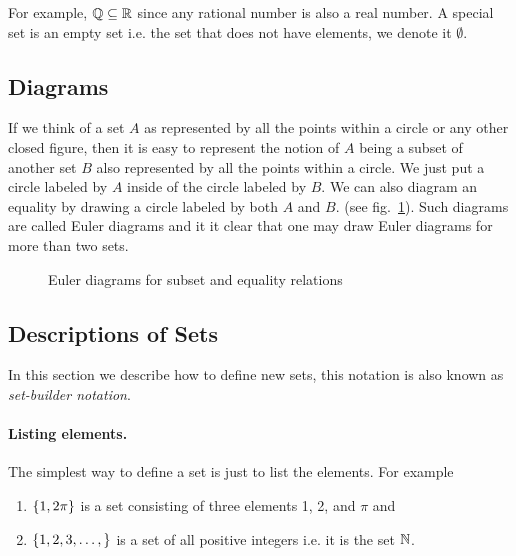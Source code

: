 For example, $\mathbb{Q} \subseteq \mathbb{R}$ since any rational number is
also a real number.
A special set is an empty set i.e. the set that does not have elements, we
denote it $\emptyset$.



\subsection{Diagrams}
If we think of a set $A$ as represented by all the points within a circle or
any other closed figure, then it is easy to represent the notion of $A$ being a
subset of another set $B$ also represented by all the points within a circle.
We just put a circle labeled by $A$ inside of the circle labeled by $B$. We can
also diagram an equality by drawing a circle labeled by both $A$ and $B$. (see
fig.~\ref{figure:euler-diagram}). Such diagrams are called Euler diagrams and
it it clear that one may draw Euler diagrams for more than two sets.

\begin{figure}
    \centering
    \qquad\qquad
    \caption{Euler diagrams for subset and equality relations}
    \label{figure:euler-diagram}
\end{figure}


\subsection{Descriptions of Sets}
In this section we describe how to define new sets, this notation is also
known as \textit{set-builder notation}.

\paragraph{Listing elements.} The simplest way to define a set is just to list
the elements. For example
\begin{enumerate}
  \item $\set{1, 2 \pi}$ is a set consisting of three elements 1, 2, and $\pi$
    and
  \item $\set{1, 2, 3, \dots, }$ is a set of all positive integers i.e. it is
    the set $\mathbb{N}$.
\end{enumerate}

